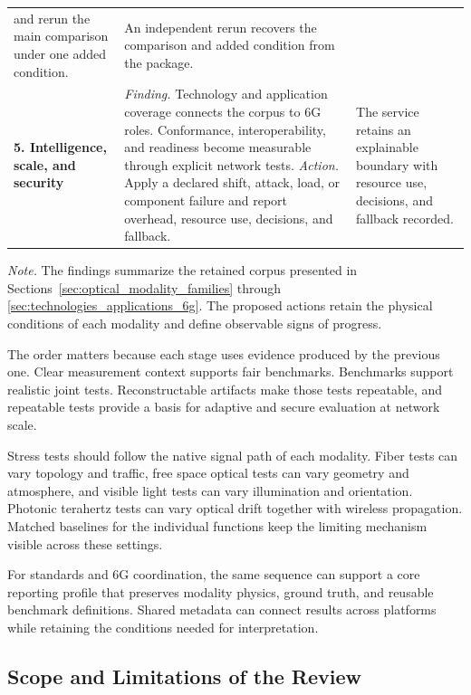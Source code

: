 \begin{table}[!t]
\begin{tabularx}{\columnwidth}{@{}
>{\raggedright\arraybackslash}p{}
>{\raggedright\arraybackslash}X
>{\raggedright\arraybackslash}p{}@{}}
and rerun the main comparison under one added condition. &
An independent rerun recovers the comparison and added condition from the
package. \\
\addlinespace[1.5pt]
\textbf{5. Intelligence, scale, and security} &
\emph{Finding.} Technology and application coverage connects the corpus to 6G
roles. Conformance, interoperability, and readiness become measurable through
explicit network tests. \emph{Action.} Apply a declared shift, attack, load, or
component failure and report overhead, resource use, decisions, and fallback. &
The service retains an explainable boundary with resource use, decisions, and
fallback recorded. \\
\bottomrule
\end{tabularx}
\vspace{1pt}
\parbox{\columnwidth}{\raggedright\footnotesize\emph{Note.} The findings
summarize the retained corpus presented in Sections~\ref{sec:optical_modality_families}
through \ref{sec:technologies_applications_6g}. The proposed actions retain the
physical conditions of each modality and define observable signs of progress.\par}
\end{table}

The order matters because each stage uses evidence produced by the previous
one. Clear measurement context supports fair benchmarks. Benchmarks support
realistic joint tests. Reconstructable artifacts make those tests repeatable,
and repeatable tests provide a basis for adaptive and secure evaluation at
network scale.

Stress tests should follow the native signal path of each modality. Fiber tests
can vary topology and traffic, free space optical tests can vary geometry and
atmosphere, and visible light tests can vary illumination and orientation.
Photonic terahertz tests can vary optical drift together with wireless
propagation. Matched baselines for the individual functions keep the limiting
mechanism visible across these settings.

For standards and 6G coordination, the same sequence can support a core
reporting profile that preserves modality physics, ground truth, and reusable
benchmark definitions. Shared metadata can connect results across platforms
while retaining the conditions needed for interpretation.

\subsection{Scope and Limitations of the Review}

